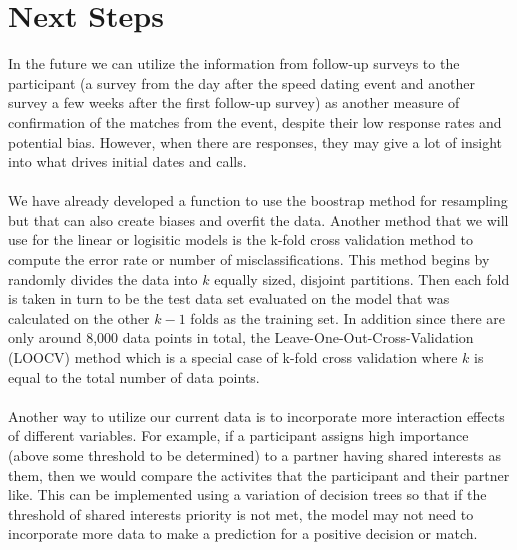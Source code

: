 \documentclass{article}
\begin{document}
\section{Next Steps}
In the future we can utilize the information from follow-up surveys to the participant (a survey from the day after the speed dating event and another survey a few weeks after the first follow-up survey) as another measure of confirmation of the matches from the event, despite their low response rates and potential bias.  However, when there are responses, they may give a lot of insight into what drives initial dates and calls.\\
\null\\
We have already developed a function to use the boostrap method for resampling but that can also create biases and overfit the data.  Another method that we will use for the linear or logisitic models is the k-fold cross validation method to compute the error rate or number of misclassifications.  This method begins by randomly divides the data into $k$ equally sized, disjoint partitions.  Then each fold is taken in turn to be the test data set evaluated on the model that was calculated on the other $k-1$ folds as the training set.  In addition since there are only around 8,000 data points in total, the Leave-One-Out-Cross-Validation (LOOCV) method which is a special case of k-fold cross validation where $k$ is equal to the total number of data points.\\
\null\\
Another way to utilize our current data is to incorporate more interaction effects of different variables.  For example, if a participant assigns high importance (above some threshold to be determined) to a partner having shared interests as them, then we would compare the activites that the participant and their partner like.  This can be implemented using a variation of decision trees so that if the threshold of shared interests priority is not met, the model may not need to incorporate more data to make a prediction for a positive decision or match.  
\end{document}
